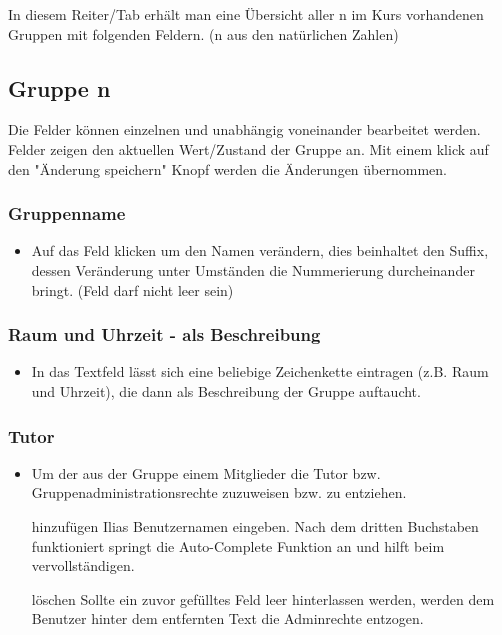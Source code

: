 In diesem Reiter/Tab erhält man eine Übersicht aller n im Kurs vorhandenen Gruppen mit folgenden Feldern. (n aus den natürlichen Zahlen)
\subsection*{Gruppe n}
Die Felder können einzelnen und unabhängig voneinander bearbeitet werden. Felder zeigen den aktuellen Wert/Zustand der Gruppe an. 
Mit einem klick auf den "Änderung speichern" Knopf werden die Änderungen übernommen. 

\subsubsection{Gruppenname}
\begin{itemize}
	\item Auf das Feld klicken um den Namen verändern, dies beinhaltet den Suffix, dessen Veränderung unter Umständen die Nummerierung durcheinander bringt. (Feld darf nicht leer sein)
\end{itemize}

\subsubsection{Raum und Uhrzeit - als Beschreibung}
\begin{itemize}
	\item In das Textfeld lässt sich eine beliebige Zeichenkette eintragen (z.B. Raum und Uhrzeit), die dann als Beschreibung der Gruppe auftaucht. 
\end{itemize}

\subsubsection{Tutor}
\begin{itemize}
	\item Um der aus der Gruppe einem Mitglieder die Tutor bzw. Gruppenadministrationsrechte zuzuweisen bzw. zu entziehen. 
	\item[hinzufügen] Ilias Benutzernamen eingeben. Nach dem dritten Buchstaben funktioniert springt die Auto-Complete Funktion an und hilft beim vervollständigen. 
	\item[löschen] Sollte ein zuvor gefülltes Feld leer hinterlassen werden, werden dem Benutzer hinter dem entfernten Text die Adminrechte entzogen.
\end{itemize}

